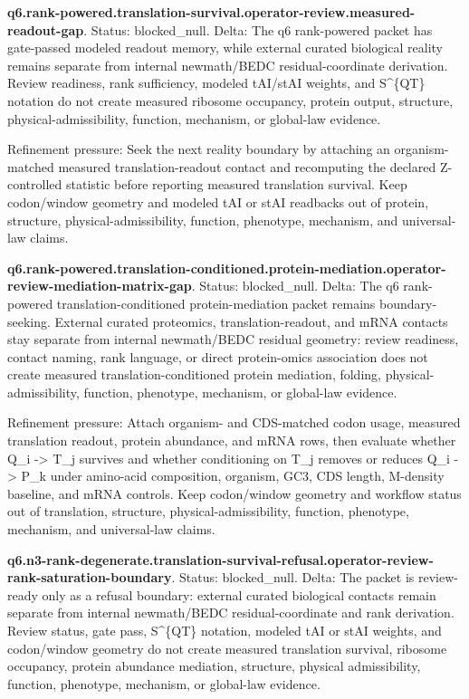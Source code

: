 \textbf{q6.rank-powered.translation-survival.operator-review.measured-readout-gap}. Status: blocked\_null. Delta: The q6 rank-powered packet has gate-passed modeled readout memory, while external curated biological reality remains separate from internal newmath/BEDC residual-coordinate derivation. Review readiness, rank sufficiency, modeled tAI/stAI weights, and S\textasciicircum{}\{QT\} notation do not create measured ribosome occupancy, protein output, structure, physical-admissibility, function, mechanism, or global-law evidence.

Refinement pressure: Seek the next reality boundary by attaching an organism-matched measured translation-readout contact and recomputing the declared Z-controlled statistic before reporting measured translation survival. Keep codon/window geometry and modeled tAI or stAI readbacks out of protein, structure, physical-admissibility, function, phenotype, mechanism, and universal-law claims.

\textbf{q6.rank-powered.translation-conditioned.protein-mediation.operator-review-mediation-matrix-gap}. Status: blocked\_null. Delta: The q6 rank-powered translation-conditioned protein-mediation packet remains boundary-seeking. External curated proteomics, translation-readout, and mRNA contacts stay separate from internal newmath/BEDC residual geometry: review readiness, contact naming, rank language, or direct protein-omics association does not create measured translation-conditioned protein mediation, folding, physical-admissibility, function, phenotype, mechanism, or global-law evidence.

Refinement pressure: Attach organism- and CDS-matched codon usage, measured translation readout, protein abundance, and mRNA rows, then evaluate whether Q\_i -> T\_j survives and whether conditioning on T\_j removes or reduces Q\_i -> P\_k under amino-acid composition, organism, GC3, CDS length, M-density baseline, and mRNA controls. Keep codon/window geometry and workflow status out of translation, structure, physical-admissibility, function, phenotype, mechanism, and universal-law claims.

\textbf{q6.n3-rank-degenerate.translation-survival-refusal.operator-review-rank-saturation-boundary}. Status: blocked\_null. Delta: The packet is review-ready only as a refusal boundary: external curated biological contacts remain separate from internal newmath/BEDC residual-coordinate and rank derivation. Review status, gate pass, S\textasciicircum{}\{QT\} notation, modeled tAI or stAI weights, and codon/window geometry do not create measured translation survival, ribosome occupancy, protein abundance mediation, structure, physical admissibility, function, phenotype, mechanism, or global-law evidence.

